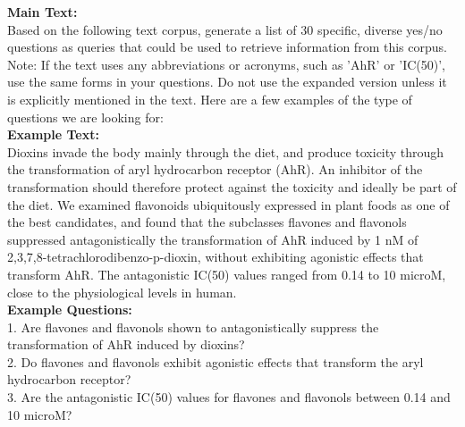 

\begin{figure*}[ht!]
    \centering
    \begin{tcolorbox}[
        enhanced,                  %
        colframe=green!50!black,   %
        colback=green!5,           %
        coltitle=white,            %
        colbacktitle=green!50!black, %
        width=\textwidth,          %
        arc=4mm,                   %
        boxrule=1mm,               %
        drop shadow,               %
        title=Corpus-Based Question Generation, %
        fonttitle=\bfseries\large  %
    ]

    \textbf{Main Text:}\\[1em]

    Based on the following text corpus, generate a list of 30 specific, diverse yes/no questions as queries that could be used to retrieve information from this corpus. Note: If the text uses any abbreviations or acronyms, such as 'AhR' or 'IC(50)', use the same forms in your questions. Do not use the expanded version unless it is explicitly mentioned in the text. Here are a few examples of the type of questions we are looking for:\\[1em]

    \textbf{Example Text:}\\[1em]
    Dioxins invade the body mainly through the diet, and produce toxicity through the transformation of aryl hydrocarbon receptor (AhR). 
    An inhibitor of the transformation should therefore protect against the toxicity and ideally be part of the diet. 
    We examined flavonoids ubiquitously expressed in plant foods as one of the best candidates, and found that the subclasses flavones 
    and flavonols suppressed antagonistically the transformation of AhR induced by 1 nM of 2,3,7,8-tetrachlorodibenzo-p-dioxin, 
    without exhibiting agonistic effects that transform AhR. The antagonistic IC(50) values ranged from 0.14 to 10 microM, close to 
    the physiological levels in human.\\[1em]

    \textbf{Example Questions:}\\[1em]
    1. Are flavones and flavonols shown to antagonistically suppress the transformation of AhR induced by dioxins?\\
    2. Do flavones and flavonols exhibit agonistic effects that transform the aryl hydrocarbon receptor?\\
    3. Are the antagonistic IC(50) values for flavones and flavonols between 0.14 and 10 microM?\\[1em]


\end{tcolorbox}
\end{figure*}
